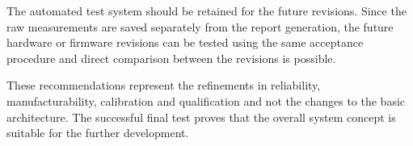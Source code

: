 The automated test system should be retained for the future revisions. Since the raw measurements are saved separately from the report generation, the future hardware or firmware revisions can be tested using the same acceptance procedure and direct comparison between the revisions is possible.

These recommendations represent the refinements in reliability, manufacturability, calibration and qualification and not the changes to the basic architecture. The successful final test proves that the overall system concept is suitable for the further development.
